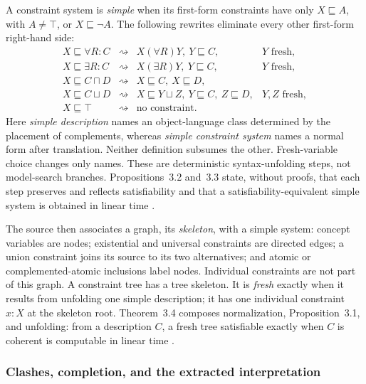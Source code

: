 A constraint system is \emph{simple} when its first-form constraints have only
\(X\sqsubseteq A\), with \(A\ne\top\), or \(X\sqsubseteq\neg A\).  The
following rewrites eliminate every other first-form right-hand side:
\[
\begin{array}{rcll}
 X\sqsubseteq\forall R:C
 &\rightsquigarrow&X(\forall R)Y,\ Y\sqsubseteq C,
 &Y\text{ fresh},\\
 X\sqsubseteq\exists R:C
 &\rightsquigarrow&X(\exists R)Y,\ Y\sqsubseteq C,
 &Y\text{ fresh},\\
 X\sqsubseteq C\sqcap D
 &\rightsquigarrow&X\sqsubseteq C,\ X\sqsubseteq D,\\
 X\sqsubseteq C\sqcup D
 &\rightsquigarrow&X\sqsubseteq Y\sqcup Z,\
                    Y\sqsubseteq C,\ Z\sqsubseteq D,
 &Y,Z\text{ fresh},\\
 X\sqsubseteq\top
 &\rightsquigarrow&\text{no constraint}.&
\end{array}
\]
Here \emph{simple description} names an object-language class determined by
the placement of complements, whereas \emph{simple constraint system} names a
normal form after translation.  Neither definition subsumes the other.
Fresh-variable choice changes only names.  These are deterministic
syntax-unfolding steps, not model-search branches.  Propositions~3.2 and~3.3
state, without proofs, that each step preserves and reflects satisfiability
and that a satisfiability-equivalent simple system is obtained in linear time
\cite[\S3, p.~10]{SchmidtSchaussSmolka1991}.

The source then associates a graph, its \emph{skeleton}, with a simple system:
concept variables are nodes; existential and universal constraints are
directed edges; a union constraint joins its source to its two alternatives;
and atomic or complemented-atomic inclusions label nodes.  Individual
constraints are not part of this graph.  A constraint tree has a tree
skeleton.  It is \emph{fresh} exactly when it results from unfolding one
simple description; it has one individual constraint \(x:X\) at the skeleton
root.  Theorem~3.4 composes normalization, Proposition~3.1, and unfolding:
from a description \(C\), a fresh tree satisfiable exactly when \(C\) is
coherent is computable in linear time
\cite[pp.~10--11]{SchmidtSchaussSmolka1991}.

\subsubsection{Clashes, completion, and the extracted interpretation}

